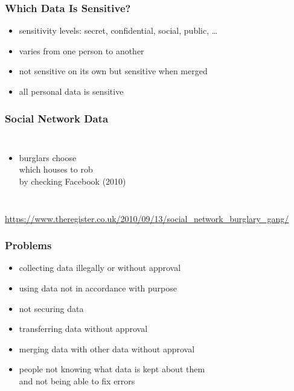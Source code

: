\documentclass[dvipsnames]{beamer}
\theoremstyle{plain}
\begin{document}
\begin{frame}
  \frametitle{Which Data Is Sensitive?}

  \begin{itemize}
    \item sensitivity levels: secret, confidential, social, public, \ldots
    \item varies from one person to another
    \item not sensitive on its own but sensitive when merged

    \bigskip
    \item all personal data is sensitive
  \end{itemize}
\end{frame}

\begin{frame}
  \frametitle{Social Network Data}

  \begin{columns}

    \begin{itemize}
    \item burglars choose\\
      which houses to rob\\
      by checking Facebook (2010)
    \end{itemize}
  \end{columns}

  \medskip
  \tiny{\url{https://www.theregister.co.uk/2010/09/13/social_network_burglary_gang/}}\\
\end{frame}

\begin{frame}
  \frametitle{Problems}

  \begin{itemize}
    \item collecting data illegally or without approval
    \item using data not in accordance with purpose
    \item not securing data
    \item transferring data without approval
    \item merging data with other data without approval
    \item people not knowing what data is kept about them\\
      and not being able to fix errors
  \end{itemize}
\end{frame}
\end{document}
